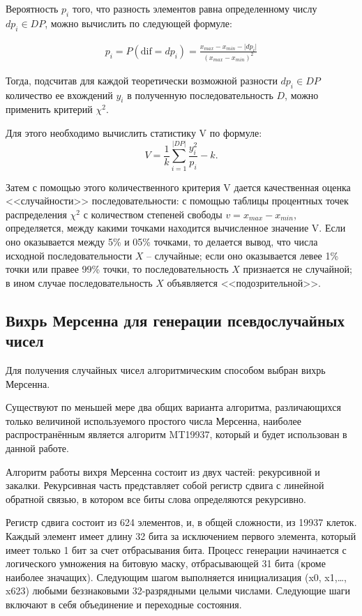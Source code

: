 \documentclass[14pt, a4paper]{extarticle}
\begin{document}
Вероятность $p_i$ того, что разность элементов равна определенному числу $dp_i \in DP$, можно вычислить по следующей формуле:

\begin{equation}
	\begin{gathered}
		p_i = P\left(\text{dif} = dp_i\right) = \frac{x_{max} - x_{min} - \lvert dp_i \lvert}{(x_{max} - x_{min})^2}
	\end{gathered}
\end{equation}

Тогда, подсчитав для каждой теоретически возможной разности $dp_i \in DP$ количество ее вхождений $y_i$ в полученную последовательность $D$, можно применить критерий $\chi^2$. 

Для этого необходимо вычислить статистику V по формуле:
\begin{equation}
	V = \frac{1}{k} \sum_{i = 1}^{\lvert DP \lvert} \frac{y_{i}^2}{p_i} - k.
\end{equation}
 
Затем с помощью этого количественного критерия V дается качественная оценка <<случайности>> последовательности: с помощью таблицы процентных точек распределения $\chi^2$ с количеством степеней свободы $v=x_{max} - x_{min}$, определяется, между какими точками находится вычисленное значение V. Если оно оказывается между 5\% и 05\% точками, то делается вывод, что числа исходной последовательности $X$ -- случайные; если оно оказывается левее 1\% точки или правее 99\% точки, то последовательность $X$ признается не случайной; в ином случае последовательность $X$ объявляется <<подозрительной>>.


\subsection{Вихрь Мерсенна для генерации псевдослучайных чисел}

Для получения случайных чисел алгоритмическим способом выбран вихрь Мерсенна.

Существуют по меньшей мере два общих варианта алгоритма, различающихся только величиной используемого простого числа Мерсенна, наиболее распространённым является алгоритм MT19937, который и будет использован в данной работе.

Алгоритм работы вихря Мерсенна состоит из двух частей: рекурсивной и закалки. Рекурсивная часть представляет собой регистр сдвига с линейной обратной связью, в котором все биты слова определяются рекурсивно.

Регистр сдвига состоит из 624 элементов, и, в общей сложности, из 19937 клеток. Каждый элемент имеет длину 32 бита за исключением первого элемента, который имеет только 1 бит за счет отбрасывания бита. Процесс генерации начинается с логического умножения на битовую маску, отбрасывающей 31 бита (кроме наиболее значащих). Следующим шагом выполняется инициализация (x0, x1,…, x623) любыми беззнаковыми 32-разрядными целыми числами. Следующие шаги включают в себя объединение и переходные состояния.
\end{document}
